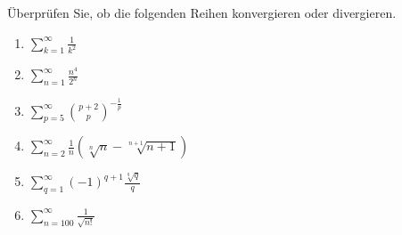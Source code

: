 \begin{aufg}[6 Punkte]
\"Uberpr\"ufen Sie, ob die folgenden Reihen konvergieren oder divergieren.
\begin{enumerate}[label=$\mathrm{(\roman*)}$, ref=$\mathrm{\roman*}$]
\item $\sum\limits_{k=1}^\infty \frac{1}{k^2}$
\item $\sum\limits_{n=1}^\infty \frac{n^4}{2^n}$
\item $\sum\limits_{p=5}^\infty \binom{p+2}{p}^{-\frac1p}$
\item $\sum\limits_{n=2}^\infty \frac1n \left( \sqrt[n]{n} - \sqrt[n+1]{n+1} \right)$
\item $\sum\limits_{q=1}^\infty (-1)^{q+1} \frac{\sqrt[q]{q}}{q}$
\item $\sum\limits_{n=100}^\infty \frac{1}{\sqrt{n!}}$
\end{enumerate}
\end{aufg}

\bigskip

